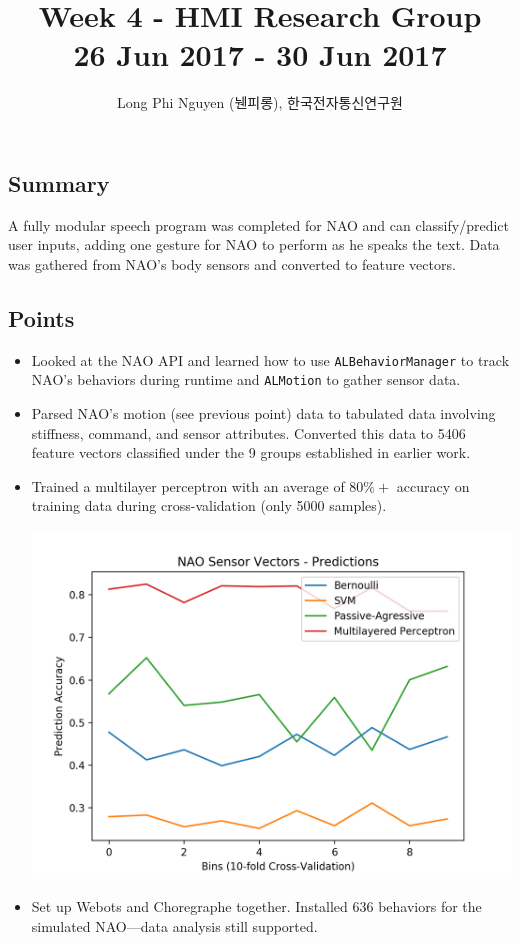\documentclass{article}
\title{Week 4 - HMI Research Group \\ \large 26 Jun 2017 - 30 Jun 2017}
\author{Long Phi Nguyen (뉀피롱), 한국전자통신연구원}
\begin{document}
  \maketitle


  \subsection*{Summary} A fully modular speech program was completed for NAO and can classify/predict user inputs, adding one gesture for NAO to perform as he speaks the text. Data was gathered from NAO's body sensors and converted to feature vectors.

  \subsection*{Points}
  \begin{itemize}
    \item Looked at the NAO API and learned how to use \verb|ALBehaviorManager| to track NAO's behaviors during runtime and \verb|ALMotion| to gather sensor data.
    \item Parsed NAO's motion (see previous point) data to tabulated data involving stiffness, command, and sensor attributes. Converted this data to 5406 feature vectors classified under the 9 groups established in earlier work.
    \item Trained a multilayer perceptron with an average of $80\%+$ accuracy on training data during cross-validation (only 5000 samples).

        \begin{center}\includegraphics[scale=0.6]{Figure_1.png}\end{center}
    \item Set up Webots and Choregraphe together. Installed 636 behaviors for the simulated NAO---data analysis still supported.
  \end{itemize}
\end{document}

